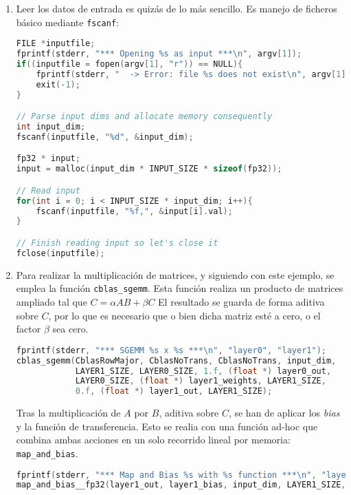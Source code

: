 \begin{enumerate}
    \item Leer los datos de entrada es quizás de lo más sencillo. Es manejo de ficheros básico mediante \texttt{fscanf}:\medskip
\begin{lstlisting}[language=C]
FILE *inputfile;
fprintf(stderr, "*** Opening %s as input ***\n", argv[1]);
if((inputfile = fopen(argv[1], "r")) == NULL){
    fprintf(stderr, "  -> Error: file %s does not exist\n", argv[1]);
    exit(-1);
}

// Parse input dims and allocate memory consequently
int input_dim;
fscanf(inputfile, "%d", &input_dim);

fp32 * input;
input = malloc(input_dim * INPUT_SIZE * sizeof(fp32));

// Read input
for(int i = 0; i < INPUT_SIZE * input_dim; i++){
    fscanf(inputfile, "%f,", &input[i].val);
}

// Finish reading input so let's close it
fclose(inputfile);
\end{lstlisting}

    \item Para realizar la multiplicación de matrices, y siguiendo con este ejemplo, se emplea la función \texttt{cblas\_sgemm}. Esta función realiza un producto de matrices ampliado tal que $C = \alpha AB + \beta C$ El resultado se guarda de forma aditiva sobre $C$, por lo que es necesario que o bien dicha matriz esté a cero, o el factor $\beta$ sea cero.\medskip
\begin{lstlisting}[language=C]
fprintf(stderr, "*** SGEMM %s x %s ***\n", "layer0", "layer1");
cblas_sgemm(CblasRowMajor, CblasNoTrans, CblasNoTrans, input_dim,
            LAYER1_SIZE, LAYER0_SIZE, 1.f, (float *) layer0_out,
            LAYER0_SIZE, (float *) layer1_weights, LAYER1_SIZE,
            0.f, (float *) layer1_out, LAYER1_SIZE);
\end{lstlisting}

    Tras la multiplicación de $A$ por $B$, aditiva sobre $C$, se han de aplicar los \textit{bias} y la función de transferencia. Esto se realia con una función ad-hoc que combina ambas acciones en un solo recorrido lineal por memoria: \texttt{map\_and\_bias}.
\begin{lstlisting}[language=C]
fprintf(stderr, "*** Map and Bias %s with %s function ***\n", "layer1_out", "sigmoid__fp32");
map_and_bias__fp32(layer1_out, layer1_bias, input_dim, LAYER1_SIZE, 'N', sigmoid__fp32);
\end{lstlisting}


\end{enumerate}
